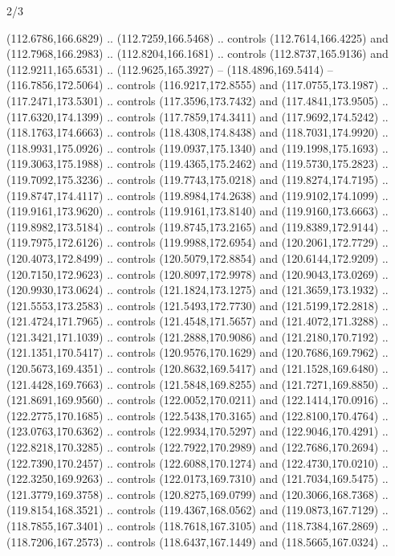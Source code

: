 \begin{flagdescription}{2/3}
\begin{scope}[shift={(0.5\flaglength,0.5)},scale=\flagwidth/320]
\begin{scope}[y=0.8pt, x=0.8pt, yscale=-1,shift={(-118.3,-146)}]
  (112.6786,166.6829) .. (112.7259,166.5468) .. controls (112.7614,166.4225) and
  (112.7968,166.2983) .. (112.8204,166.1681) .. controls (112.8737,165.9136) and
  (112.9211,165.6531) .. (112.9625,165.3927) -- (118.4896,169.5414) --
  (116.7856,172.5064) .. controls (116.9217,172.8555) and (117.0755,173.1987) ..
  (117.2471,173.5301) .. controls (117.3596,173.7432) and (117.4841,173.9505) ..
  (117.6320,174.1399) .. controls (117.7859,174.3411) and (117.9692,174.5242) ..
  (118.1763,174.6663) .. controls (118.4308,174.8438) and (118.7031,174.9920) ..
  (118.9931,175.0926) .. controls (119.0937,175.1340) and (119.1998,175.1693) ..
  (119.3063,175.1988) .. controls (119.4365,175.2462) and (119.5730,175.2823) ..
  (119.7092,175.3236) .. controls (119.7743,175.0218) and (119.8274,174.7195) ..
  (119.8747,174.4117) .. controls (119.8984,174.2638) and (119.9102,174.1099) ..
  (119.9161,173.9620) .. controls (119.9161,173.8140) and (119.9160,173.6663) ..
  (119.8982,173.5184) .. controls (119.8745,173.2165) and (119.8389,172.9144) ..
  (119.7975,172.6126) .. controls (119.9988,172.6954) and (120.2061,172.7729) ..
  (120.4073,172.8499) .. controls (120.5079,172.8854) and (120.6144,172.9209) ..
  (120.7150,172.9623) .. controls (120.8097,172.9978) and (120.9043,173.0269) ..
  (120.9930,173.0624) .. controls (121.1824,173.1275) and (121.3659,173.1932) ..
  (121.5553,173.2583) .. controls (121.5493,172.7730) and (121.5199,172.2818) ..
  (121.4724,171.7965) .. controls (121.4548,171.5657) and (121.4072,171.3288) ..
  (121.3421,171.1039) .. controls (121.2888,170.9086) and (121.2180,170.7192) ..
  (121.1351,170.5417) .. controls (120.9576,170.1629) and (120.7686,169.7962) ..
  (120.5673,169.4351) .. controls (120.8632,169.5417) and (121.1528,169.6480) ..
  (121.4428,169.7663) .. controls (121.5848,169.8255) and (121.7271,169.8850) ..
  (121.8691,169.9560) .. controls (122.0052,170.0211) and (122.1414,170.0916) ..
  (122.2775,170.1685) .. controls (122.5438,170.3165) and (122.8100,170.4764) ..
  (123.0763,170.6362) .. controls (122.9934,170.5297) and (122.9046,170.4291) ..
  (122.8218,170.3285) .. controls (122.7922,170.2989) and (122.7686,170.2694) ..
  (122.7390,170.2457) .. controls (122.6088,170.1274) and (122.4730,170.0210) ..
  (122.3250,169.9263) .. controls (122.0173,169.7310) and (121.7034,169.5475) ..
  (121.3779,169.3758) .. controls (120.8275,169.0799) and (120.3066,168.7368) ..
  (119.8154,168.3521) .. controls (119.4367,168.0562) and (119.0873,167.7129) ..
  (118.7855,167.3401) .. controls (118.7618,167.3105) and (118.7384,167.2869) ..
  (118.7206,167.2573) .. controls (118.6437,167.1449) and (118.5665,167.0324) ..

\end{scope}
\end{scope}
\end{flagdescription}
